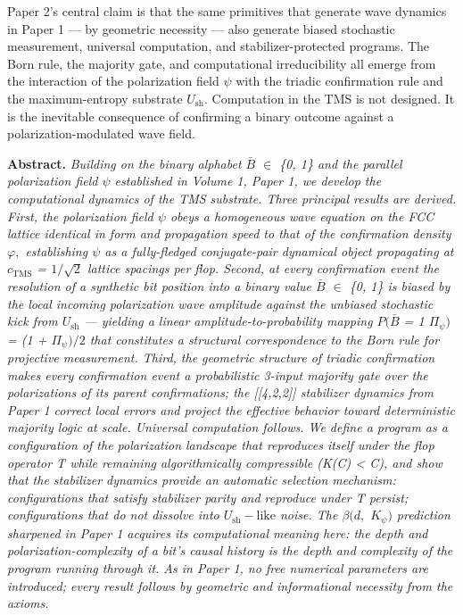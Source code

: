 \documentclass[11pt,oneside]{report}
\theoremstyle{definition}
\theoremstyle{remark}
\newenvironment{paperabstract}
  {\begin{center}\begin{minipage}{0.88\textwidth}\small
   \noindent\textbf{Abstract.}\itshape\space}
  {\end{minipage}\end{center}\vspace{0.4em}}
\begin{document}
Paper 2's central claim is that the same primitives that generate wave
dynamics in Paper 1 --- by geometric necessity --- also generate biased
stochastic measurement, universal computation, and stabilizer-protected
programs. The Born rule, the majority gate, and computational
irreducibility all emerge from the interaction of the polarization field
\ensuremath{\psi} with the triadic confirmation rule and the maximum-entropy substrate
\ensuremath{U_{\mathrm{sh}}.} Computation in the TMS is not designed. It is the inevitable
consequence of confirming a binary outcome against a
polarization-modulated wave field.

\begin{paperabstract}
Building on the binary alphabet \ensuremath{\bar{B}} \ensuremath{\in} \{0, 1\} and the parallel
polarization field \ensuremath{\psi} established in Volume 1, Paper 1, we develop the
computational dynamics of the TMS substrate. Three principal results are
derived. First, the polarization field \ensuremath{\psi} obeys a homogeneous wave
equation on the FCC lattice identical in form and propagation speed to
that of the confirmation density \ensuremath{\varphi ,} establishing \ensuremath{\psi} as a fully-fledged
conjugate-pair dynamical object propagating at \ensuremath{c_{\mathrm{TMS}}} = \ensuremath{1/\sqrt{2}} lattice
spacings per flop. Second, at every confirmation event the resolution of
a synthetic bit position into a binary value \ensuremath{\bar{B}} \ensuremath{\in} \{0, 1\} is biased by
the local incoming polarization wave amplitude against the unbiased
stochastic kick from \ensuremath{U_{\mathrm{sh}}} --- yielding a linear amplitude-to-probability
mapping \ensuremath{P(\bar{B}} = 1 \textbar{} \ensuremath{\Pi_{\psi})} = (1 + \ensuremath{\Pi_{\psi})/2} that constitutes a
structural correspondence to the Born rule for projective measurement.
Third, the geometric structure of triadic confirmation makes every
confirmation event a probabilistic 3-input majority gate over the
polarizations of its parent confirmations; the [[4,2,2]]
stabilizer dynamics from Paper 1 correct local errors and project the
effective behavior toward deterministic majority logic at scale.
Universal computation follows. We define a program as a configuration of
the polarization landscape that reproduces itself under the flop
operator T while remaining algorithmically compressible (K(C)
\textless{} \textbar C\textbar), and show that the stabilizer dynamics
provide an automatic selection mechanism: configurations that satisfy
stabilizer parity and reproduce under T persist; configurations that do
not dissolve into \ensuremath{U_{\mathrm{sh}}-\text{like}} noise. The \ensuremath{\beta (d,} \ensuremath{K_{\psi})} prediction sharpened in
Paper 1 acquires its computational meaning here: the depth and
polarization-complexity of a bit's causal history is the depth and
complexity of the program running through it. As in Paper 1, no free
numerical parameters are introduced; every result follows by geometric
and informational necessity from the axioms.


\end{paperabstract}
\end{document}
